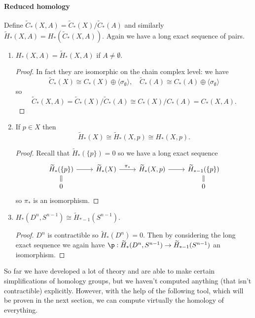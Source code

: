 \documentclass[a4paper]{article}
\renewcommand{\b}{\p}
\begin{document}
\paragraph{Reduced homology}

Define \(\widetilde C_*(X, A) = \widetilde C_*(X)/\widetilde C_*(A)\) and similarly \(\widetilde H_*(X, A) = H_*(\widetilde C_*(X, A))\). Again we have a long exact sequence of pairs.

\begin{eg}\leavevmode
  \begin{enumerate}
  \item \(H_*(X, A) = \widetilde H_*(X, A)\) if \(A \neq \emptyset\).
    \begin{proof}
      In fact they are isomorphic on the chain complex level: we have
      \[
        \widetilde C_*(X) \cong C_*(X) \oplus \langle \sigma_\emptyset \rangle, \quad
        \widetilde C_*(A) \cong C_*(A) \oplus \langle \sigma_\emptyset \rangle
      \]
      so
      \[
        \widetilde C_*(X, A) = \widetilde C_*(X)/\widetilde C_*(A) \cong C_*(X)/C_*(A) = C_*(X, A).
      \]
    \end{proof}
  \item If \(p \in X\) then
    \[
      \widetilde H_*(X) \cong \widetilde H_*(X, p) \cong H_*(X, p).
    \]
    \begin{proof}
      Recall that \(\widetilde H_*(\{p\}) = 0\) so we have a long exact sequence
      \[
        \begin{tikzcd}[row sep=small]
          \widetilde H_*(\{p\}) \ar[r] \ar[d, equal] & \widetilde H_*(X) \ar[r, "\pi_*"] & \widetilde H_*(X, p) \ar[r] & \widetilde H_{* - 1}(\{p\}) \ar[d, equal] \\
          0 & & & 0
        \end{tikzcd}
      \]
      so \(\pi_*\) is an isomorphism.
    \end{proof}
  \item \(H_*(D^n, S^{n - 1}) \cong \widetilde H_{* -1}(S^{n - 1})\).
    \begin{proof}
      \(D^n\) is contractible so \(\widetilde H_*(D^n) = 0\). Then by considering the long exact sequence we again have \(\b: \widetilde H_*(D^n, S^{n -1}) \to \widetilde H_{* - 1}(S^{n - 1})\) an isomorphism.
    \end{proof}
  \end{enumerate}
\end{eg}

So far we have developed a lot of theory and are able to make certain simplifications of homology groups, but we haven't computed anything (that isn't contractible) explicitly. However, with the help of the following tool, which will be proven in the next section, we can compute virtually the homology of everything.
\end{document}
